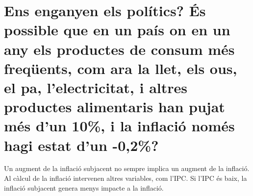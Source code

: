 \section{
  Ens enganyen els polítics? És possible que en un país on en un any els
  productes de consum més freqüents, com ara la llet, els ous, el pa,
  l’electricitat, i altres
  productes alimentaris han pujat més d’un 10\%, 
  i la inflació només hagi estat d’un
  -0,2\%?
}

Un augment de la inflació subjacent no sempre implica un augment de la 
inflació. Al càlcul de la inflació intervenen altres variables, com l'IPC.
Si l'IPC és baix, la inflació subjacent genera menys impacte a la inflació.

